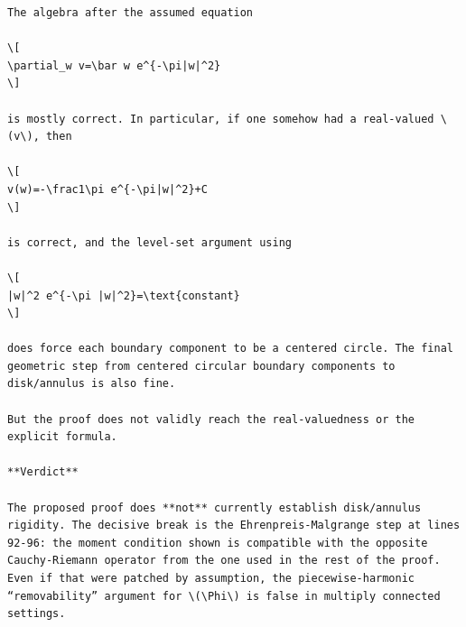 \documentclass[11pt]{article}
\newcommand{\1}{\mathbf 1}
\begin{document}
\begin{verbatim}
The algebra after the assumed equation

\[
\partial_w v=\bar w e^{-\pi|w|^2}
\]

is mostly correct. In particular, if one somehow had a real-valued \(v\), then

\[
v(w)=-\frac1\pi e^{-\pi|w|^2}+C
\]

is correct, and the level-set argument using

\[
|w|^2 e^{-\pi |w|^2}=\text{constant}
\]

does force each boundary component to be a centered circle. The final geometric step from centered circular boundary components to disk/annulus is also fine.

But the proof does not validly reach the real-valuedness or the explicit formula.

**Verdict**

The proposed proof does **not** currently establish disk/annulus rigidity. The decisive break is the Ehrenpreis-Malgrange step at lines 92-96: the moment condition shown is compatible with the opposite Cauchy-Riemann operator from the one used in the rest of the proof. Even if that were patched by assumption, the piecewise-harmonic “removability” argument for \(\Phi\) is false in multiply connected settings.
\end{verbatim}
\end{document}
